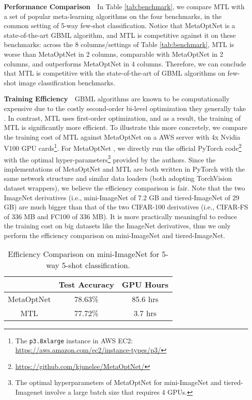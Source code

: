 \documentclass{article}
\begin{document}
\textbf{Performance Comparison}~~In Table \ref{tab:benchmark}, we compare MTL with a set of popular meta-learning algorithms on the four benchmarks, in the common setting of 5-way few-shot classification. Notice that MetaOptNet is a state-of-the-art GBML algorithm, and MTL is competitive against it on these benchmarks: across the 8 columns/settings of Table \ref{tab:benchmark}, MTL is worse than MetaOptNet in 2 columns, comparable with MetaOptNet in 2 columns, and outperforms MetaOptNet in 4 columns. Therefore, we can conclude that MTL is competitive with the state-of-the-art of GBML algorithms on few-shot image classification benchmarks.

\textbf{Training Efficiency}~~GBML algorithms are known to be computationally expensive due to the costly second-order bi-level optimization they generally take \cite{hospedales2020metalearning}. In contrast, MTL uses first-order optimization, and as a result, the training of MTL is significantly more efficient. To illustrate this more concretely, we compare the training cost of MTL against MetaOptNet on a AWS server with 4x Nvidia V100 GPU cards\footnote{The \texttt{p3.8xlarge} instance in AWS EC2: {\url{https://aws.amazon.com/ec2/instance-types/p3/}}}. For MetaOptNet \cite{metaOptNet}, we directly run the official PyTorch code\footnote{{\url{https://github.com/kjunelee/MetaOptNet/}}} with the optimal hyper-parameters\footnote{The optimal hyperparameters of MetaOptNet for mini-ImageNet and tiered-Imagenet involve a large batch size that requires 4 GPUs.} provided by the authors. Since the implementations of MetaOptNet and MTL are both written in PyTorch with the same network structure and similar data loaders (both adopting TorchVision dataset wrappers), we believe the efficiency comparison is fair. Note that the two ImageNet derivatives (i.e., mini-ImageNet of 7.2 GB and tiered-ImageNet of 29 GB) are much bigger than that of the two CIFAR-100 derivatives (i.e., CIFAR-FS of 336 MB and FC100 of 336 MB). It is more practically meaningful to reduce the training cost on big datasets like the ImageNet derivatives, thus we only perform the efficiency comparison on mini-ImageNet and tiered-ImageNet.
 \begin{table}[t!]
     \caption{Efficiency Comparison on mini-ImageNet for 5-way 5-shot classification.}
    \label{tab:gpu-hour:all}
    \vspace{+10pt}
    \centering
    \begin{tabular}{c c c }
        \toprule
         & Test Accuracy & GPU Hours \\
        \midrule
        MetaOptNet & 78.63\%  & 85.6 hrs\\
        \midrule
        MTL & 77.72\% & 3.7 hrs\\
        \bottomrule
    \end{tabular}
\end{table}
\end{document}
